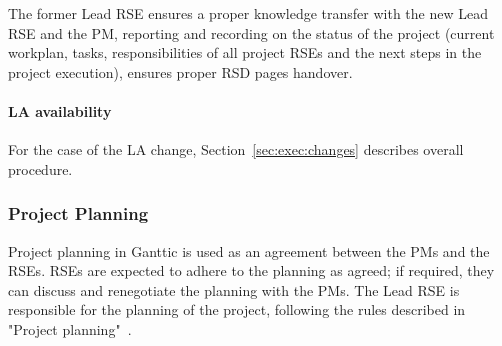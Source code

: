 The former Lead RSE ensures a proper knowledge transfer with the new Lead RSE and the PM, 
reporting and recording on the status of the project (current workplan, tasks, responsibilities of all project RSEs 
and the next steps in the project execution), ensures proper RSD pages handover. 

\paragraph{LA availability} For the case of the LA change, Section~\ref{sec:exec:changes} describes overall procedure.

\subsubsection{Project Planning}
\label{init:planning}
Project planning in Ganttic is used as an agreement between the PMs and the RSEs. RSEs are expected to adhere to the
planning as agreed; if required, they can discuss and renegotiate the planning with the PMs.
The Lead RSE is responsible for the planning of the project, following the rules described in "Project planning"~\cite{planning-intranet}.




